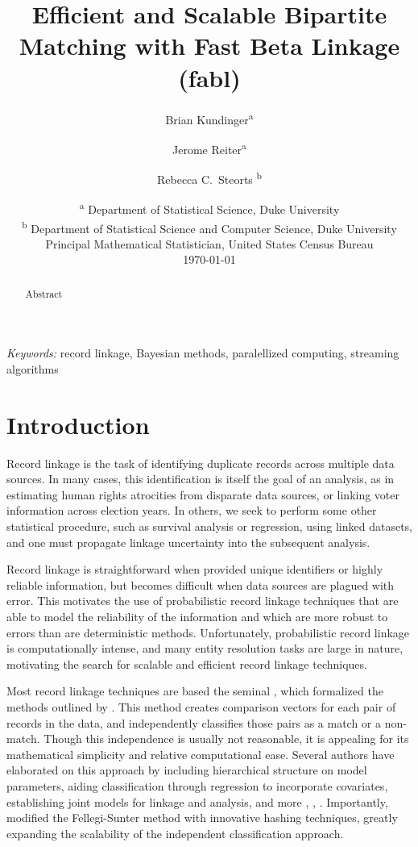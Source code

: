 \documentclass[12pt,letterpaper]{article}
\title{Efficient and Scalable Bipartite Matching with Fast Beta Linkage  (fabl)}
\author{Brian Kundinger\textsuperscript{a} \and
  Jerome Reiter\textsuperscript{a} \and 
  Rebecca C.~Steorts \textsuperscript{b}}
\date{
 \textsuperscript{a} Department of Statistical Science, Duke University \\
 \textsuperscript{b} Department of Statistical Science and Computer Science, Duke University\\Principal Mathematical Statistician, United States Census Bureau\\[2ex]
  \today}
\newcommand{\1}[1]{\mathbb{I}\!\left[#1\right]} %
\def\spacingset#1{\renewcommand{\baselinestretch}%
  {#1}\small\normalsize} \spacingset{1}
\begin{document}
\maketitle

\bigskip
\begin{abstract}
Abstract
\end{abstract}


\noindent%
{\it Keywords:} record linkage, Bayesian methods, paralellized computing, streaming algorithms

\newpage
\spacingset{1.5}

\section{Introduction}
\label{sec:introduction}

Record linkage is the task of identifying
duplicate records across multiple data sources. In many cases, this identification is itself the goal of an analysis, as in estimating human rights atrocities from disparate data sources, or linking voter information across election years. In others, we seek to perform some other statistical procedure, such as survival analysis or regression, using linked datasets, and one must  propagate linkage uncertainty into the subsequent analysis. 

Record linkage is straightforward when provided unique identifiers or highly reliable information, but becomes difficult when data sources are plagued with error. This motivates the use of probabilistic record linkage techniques that are able to model the reliability of the information and which are more robust to errors than are deterministic methods. Unfortunately, probabilistic record linkage is computationally intense, and many entity resolution tasks are large in nature,
motivating the search for scalable and efficient record linkage techniques. 

Most record linkage techniques are based the seminal \citep{fs}, which formalized the methods outlined by \citep{newcombe}. This method creates comparison vectors for each pair of records in the data, and independently classifies those pairs as a match or a non-match. Though this independence is usually not reasonable, it is appealing for its mathematical simplicity and relative computational ease. Several authors have elaborated on this approach by including hierarchical structure on model parameters, aiding classification through regression to incorporate covariates, establishing joint models for linkage and analysis, and more \citep{larsen2005}, \citep{hu2017}, \citep{hof2017}. Importantly, \citep{enamorado2019} modified the Fellegi-Sunter method with innovative hashing techniques, greatly expanding the scalability of the independent classification approach. 
\end{document}
